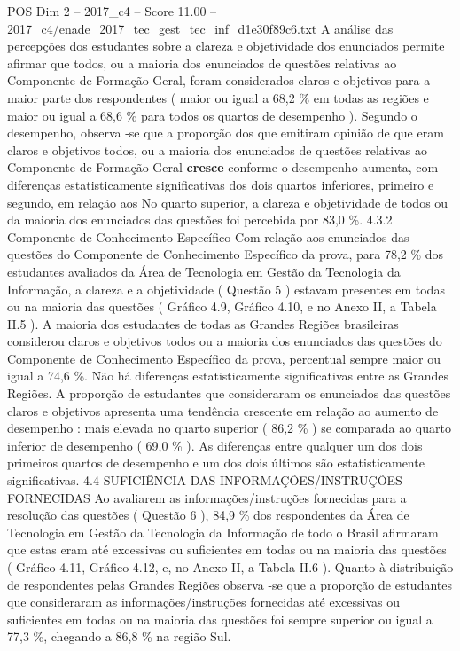 \begin{textsample}{POS Dim 2 – 2017\_c4 – Score 11.00 – 2017\_c4/enade\_2017\_tec\_gest\_tec\_inf\_d1e30f89c6.txt}
A análise das percepções dos estudantes sobre a clareza e objetividade dos enunciados permite afirmar que todos, ou a maioria dos enunciados de questões relativas ao Componente de Formação Geral, foram considerados claros e objetivos para a maior parte dos respondentes ( maior ou igual a 68,2 \% em todas as regiões e maior ou igual a 68,6 \% para todos os quartos de desempenho ).
Segundo o desempenho, observa -se que a proporção dos que emitiram opinião de que eram claros e objetivos todos, ou a maioria dos enunciados de questões relativas ao Componente de Formação Geral \textbf{cresce} conforme o desempenho aumenta, com diferenças estatisticamente significativas dos dois quartos inferiores, primeiro e segundo, em relação aos No quarto superior, a clareza e objetividade de todos ou da maioria dos enunciados das questões foi percebida por 83,0 \%. 4.3.2 Componente de Conhecimento Específico Com relação aos enunciados das questões do Componente de Conhecimento Específico da prova, para 78,2 \% dos estudantes avaliados da Área de Tecnologia em Gestão da Tecnologia da Informação, a clareza e a objetividade ( Questão 5 ) estavam presentes em todas ou na maioria das questões ( Gráfico 4.9, Gráfico 4.10, e no Anexo II, a Tabela II.5 ).
A maioria dos estudantes de todas as Grandes Regiões brasileiras considerou claros e objetivos todos ou a maioria dos enunciados das questões do Componente de Conhecimento Específico da prova, percentual sempre maior ou igual a 74,6 \%.
Não há diferenças estatisticamente significativas entre as Grandes Regiões.
A proporção de estudantes que consideraram os enunciados das questões claros e objetivos apresenta uma tendência crescente em relação ao aumento de desempenho : mais elevada no quarto superior ( 86,2 \% ) se comparada ao quarto inferior de desempenho ( 69,0 \% ).
As diferenças entre qualquer um dos dois primeiros quartos de desempenho e um dos dois últimos são estatisticamente significativas. 4.4 SUFICIÊNCIA DAS INFORMAÇÕES/INSTRUÇÕES FORNECIDAS Ao avaliarem as informações/instruções fornecidas para a resolução das questões ( Questão 6 ), 84,9 \% dos respondentes da Área de Tecnologia em Gestão da Tecnologia da Informação de todo o Brasil afirmaram que estas eram até excessivas ou suficientes em todas ou na maioria das questões ( Gráfico 4.11, Gráfico 4.12, e, no Anexo II, a Tabela II.6 ).
Quanto à distribuição de respondentes pelas Grandes Regiões observa -se que a proporção de estudantes que consideraram as informações/instruções fornecidas até excessivas ou suficientes em todas ou na maioria das questões foi sempre superior ou igual a 77,3 \%, chegando a 86,8 \% na região Sul.

\end{textsample}

